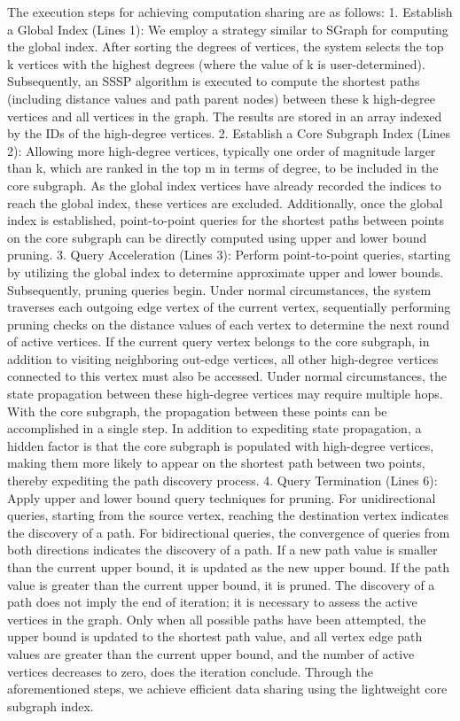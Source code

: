 \documentclass[lettersize,journal]{IEEEtran} %
\begin{document}
The execution steps for achieving computation sharing are as follows: 1. Establish a Global Index (Lines 1): We employ a strategy similar to SGraph for computing the global index. After sorting the degrees of vertices, the system selects the top k vertices with the highest degrees (where the value of k is user-determined). Subsequently, an SSSP algorithm is executed to compute the shortest paths (including distance values and path parent nodes) between these k high-degree vertices and all vertices in the graph. The results are stored in an array indexed by the IDs of the high-degree vertices. 2. Establish a Core Subgraph Index (Lines 2): Allowing more high-degree vertices, typically one order of magnitude larger than k, which are ranked in the top m in terms of degree, to be included in the core subgraph. As the global index vertices have already recorded the indices to reach the global index, these vertices are excluded. Additionally, once the global index is established, point-to-point queries for the shortest paths between points on the core subgraph can be directly computed using upper and lower bound pruning. 3. Query Acceleration (Lines 3): Perform point-to-point queries, starting by utilizing the global index to determine approximate upper and lower bounds. Subsequently, pruning queries begin. Under normal circumstances, the system traverses each outgoing edge vertex of the current vertex, sequentially performing pruning checks on the distance values of each vertex to determine the next round of active vertices. If the current query vertex belongs to the core subgraph, in addition to visiting neighboring out-edge vertices, all other high-degree vertices connected to this vertex must also be accessed. Under normal circumstances, the state propagation between these high-degree vertices may require multiple hops. With the core subgraph, the propagation between these points can be accomplished in a single step. In addition to expediting state propagation, a hidden factor is that the core subgraph is populated with high-degree vertices, making them more likely to appear on the shortest path between two points, thereby expediting the path discovery process. 4. Query Termination (Lines 6): Apply upper and lower bound query techniques for pruning. For unidirectional queries, starting from the source vertex, reaching the destination vertex indicates the discovery of a path. For bidirectional queries, the convergence of queries from both directions indicates the discovery of a path. If a new path value is smaller than the current upper bound, it is updated as the new upper bound. If the path value is greater than the current upper bound, it is pruned. The discovery of a path does not imply the end of iteration; it is necessary to assess the active vertices in the graph. Only when all possible paths have been attempted, the upper bound is updated to the shortest path value, and all vertex edge path values are greater than the current upper bound, and the number of active vertices decreases to zero, does the iteration conclude. Through the aforementioned steps, we achieve efficient data sharing using the lightweight core subgraph index.
\end{document}
